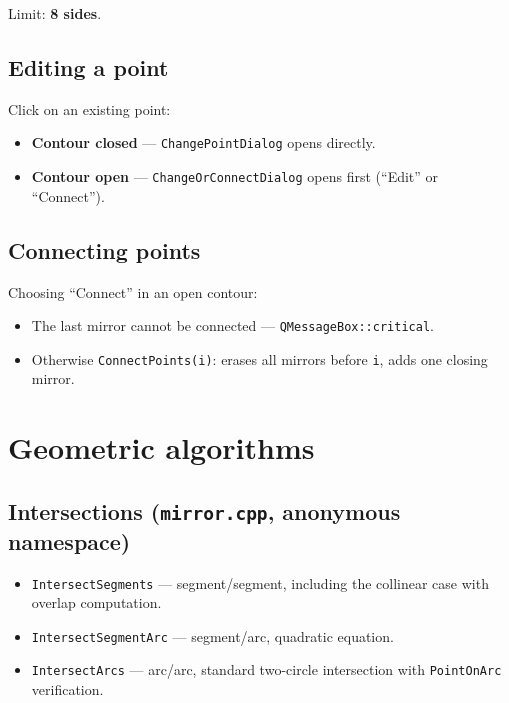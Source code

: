 \documentclass[a4paper,11pt]{article}
\newcommand{\file}[1]{\texttt{#1}}
\newcommand{\code}[1]{\texttt{#1}}
\begin{document}
Limit: \textbf{8 sides}.

\subsection{Editing a point}

Click on an existing point:
\begin{itemize}[leftmargin=*]
    \item \textbf{Contour closed} — \code{ChangePointDialog} opens
          directly.
    \item \textbf{Contour open} — \code{ChangeOrConnectDialog} opens
          first (``Edit'' or ``Connect'').
\end{itemize}

\subsection{Connecting points}

Choosing ``Connect'' in an open contour:
\begin{itemize}[leftmargin=*]
    \item The last mirror cannot be connected —
          \code{QMessageBox::critical}.
    \item Otherwise \code{ConnectPoints(i)}: erases all mirrors before
          \code{i}, adds one closing mirror.
\end{itemize}

\section{Geometric algorithms}

\subsection{Intersections (\file{mirror.cpp}, anonymous namespace)}

\begin{itemize}[leftmargin=*]
    \item \code{IntersectSegments} — segment/segment, including the
          collinear case with overlap computation.
    \item \code{IntersectSegmentArc} — segment/arc, quadratic equation.
    \item \code{IntersectArcs} — arc/arc, standard two-circle
          intersection with \code{PointOnArc} verification.
\end{itemize}
\end{document}
